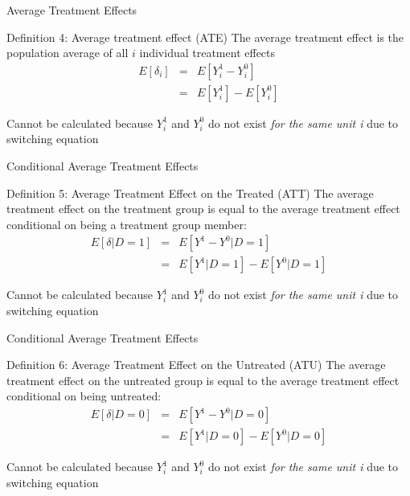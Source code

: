 \documentclass{beamer}
\begin{document}
\begin{frame}{Average Treatment Effects}

  \begin{block}{Definition 4: Average treatment effect (ATE)}
    The average treatment effect is the population average of all $i$ individual treatment effects
    \begin{eqnarray*}
      E[\delta_i]&=&E[Y_i^1-Y_i^0]\\
      &=&E[Y^1_i] - E[Y^0_i]
    \end{eqnarray*}
  \end{block}

  \bigskip

  Cannot be calculated because $Y^1_i$ and $Y^0_i$ do not exist \emph{for the same unit i} due to switching equation



\end{frame}



\begin{frame}{Conditional Average Treatment Effects}


  \begin{block}{Definition 5: Average Treatment Effect on the Treated (ATT)}
    The average treatment effect on the treatment group is equal to the average treatment effect conditional on being a treatment group member:
    \begin{eqnarray*}
      E[\delta|D=1]&=&E[Y^1-Y^0|D=1] \nonumber \\
      &=&E[Y^1|D=1]-E[Y^0|D=1]
    \end{eqnarray*}
  \end{block}
  Cannot be calculated because $Y^1_i$ and $Y^0_i$ do not exist \emph{for the same unit i} due to switching equation


\end{frame}

\begin{frame}{Conditional Average Treatment Effects}

  \begin{block}{Definition 6: Average Treatment Effect on the Untreated (ATU)}
    The average treatment effect on the untreated group is equal to the average treatment effect conditional on being untreated:
    \begin{eqnarray*}
      E[\delta|D=0]&=&E[Y^1-Y^0|D=0] \nonumber \\
      &=&E[Y^1|D=0]-E[Y^0|D=0]
    \end{eqnarray*}
  \end{block}
  Cannot be calculated because $Y^1_i$ and $Y^0_i$ do not exist \emph{for the same unit i} due to switching equation

\end{frame}
\end{document}
